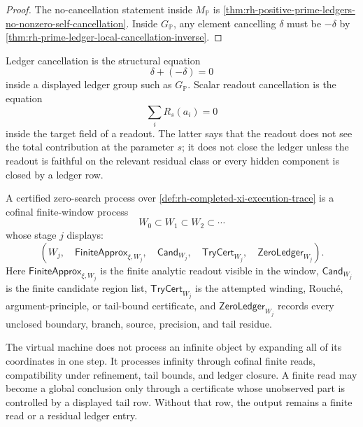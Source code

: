 \begin{proof}
The no-cancellation statement inside $M_{\mathbb P}$ is
\autoref{thm:rh-positive-prime-ledgers-no-nonzero-self-cancellation}.
Inside $G_{\mathbb P}$, any element cancelling $\delta$ must be
$-\delta$ by
\autoref{thm:rh-prime-ledger-local-cancellation-inverse}.
\end{proof}

\begin{principle}
\label{prin:rh-readout-cancellation-ledger-cancellation-differ}
Ledger cancellation is the structural equation
$$
\delta+(-\delta)=0
$$
inside a displayed ledger group such as $G_{\mathbb P}$.  Scalar readout
cancellation is the equation
$$
\sum_i R_s(a_i)=0
$$
inside the target field of a readout.  The latter says that the readout
does not see the total contribution at the parameter $s$; it does not
close the ledger unless the readout is faithful on the relevant
residual class or every hidden component is closed by a ledger row.
\end{principle}

\begin{definition}
\label{def:rh-certified-zero-search-process}
A certified zero-search process over
\autoref{def:rh-completed-xi-execution-trace} is a cofinal finite-window
process
$$
W_0\subset W_1\subset W_2\subset\cdots
$$
whose stage $j$ displays:
$$
\left(
W_j,\quad
\mathsf{FiniteApprox}_{\xi,W_j},\quad
\mathsf{Cand}_{W_j},\quad
\mathsf{TryCert}_{W_j},\quad
\mathsf{ZeroLedger}_{W_j}
\right).
$$
Here $\mathsf{FiniteApprox}_{\xi,W_j}$ is the finite analytic readout
visible in the window, $\mathsf{Cand}_{W_j}$ is the finite candidate
region list, $\mathsf{TryCert}_{W_j}$ is the attempted winding,
Rouch\'e, argument-principle, or tail-bound certificate, and
$\mathsf{ZeroLedger}_{W_j}$ records every unclosed boundary, branch,
source, precision, and tail residue.
\end{definition}

\begin{principle}
\label{prin:rh-infinite-execution-finite-read-tail-control}
The virtual machine does not process an infinite object by expanding all
of its coordinates in one step.  It processes infinity through cofinal
finite reads, compatibility under refinement, tail bounds, and ledger
closure.  A finite read may become a global conclusion only through a
certificate whose unobserved part is controlled by a displayed tail row.
Without that row, the output remains a finite read or a residual ledger
entry.
\end{principle}

